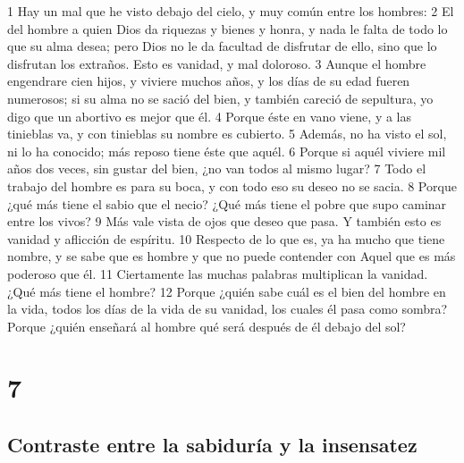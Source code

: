1 Hay un mal que he visto debajo del cielo, y muy común entre los hombres:
2 El del hombre a quien Dios da riquezas y bienes y honra, y nada le falta de todo lo que su alma desea; pero Dios no le da facultad de disfrutar de ello, sino que lo disfrutan los extraños. Esto es vanidad, y mal doloroso.
3 Aunque el hombre engendrare cien hijos, y viviere muchos años, y los días de su edad fueren numerosos; si su alma no se sació del bien, y también careció de sepultura, yo digo que un abortivo es mejor que él.
4 Porque éste en vano viene, y a las tinieblas va, y con tinieblas su nombre es cubierto.
5 Además, no ha visto el sol, ni lo ha conocido; más reposo tiene éste que aquél.
6 Porque si aquél viviere mil años dos veces, sin gustar del bien, ¿no van todos al mismo lugar?
7 Todo el trabajo del hombre es para su boca, y con todo eso su deseo no se sacia.
8 Porque ¿qué más tiene el sabio que el necio? ¿Qué más tiene el pobre que supo caminar entre los vivos?
9 Más vale vista de ojos que deseo que pasa. Y también esto es vanidad y aflicción de espíritu.
10 Respecto de lo que es, ya ha mucho que tiene nombre, y se sabe que es hombre y que no puede contender con Aquel que es más poderoso que él.
11 Ciertamente las muchas palabras multiplican la vanidad. ¿Qué más tiene el hombre?
12 Porque ¿quién sabe cuál es el bien del hombre en la vida, todos los días de la vida de su vanidad, los cuales él pasa como sombra? Porque ¿quién enseñará al hombre qué será después de él debajo del sol?

\chapter{7}

\section*{Contraste entre la sabiduría y la insensatez}

